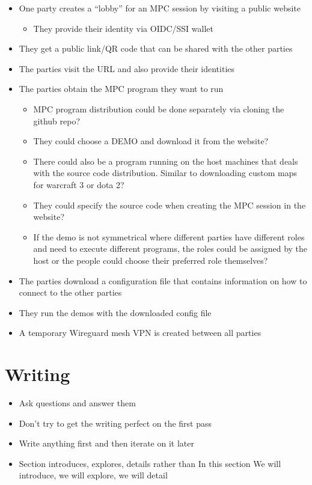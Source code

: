 \begin{itemize}
\tightlist
\item
  One party creates a ``lobby'' for an MPC session by visiting a public website

  \begin{itemize}
  \tightlist
  \item
    They provide their identity via OIDC/SSI wallet
  \end{itemize}
\item
  They get a public link/QR code that can be shared with the other parties
\item
  The parties visit the URL and also provide their identities
\item
  The parties obtain the MPC program they want to run

  \begin{itemize}
  \tightlist
  \item
    MPC program distribution could be done separately via cloning the github repo?
  \item
    They could choose a DEMO and download it from the website?
  \item
    There could also be a program running on the host machines that deals with the source code distribution. Similar to downloading custom maps for warcraft 3 or dota 2?
  \item
    They could specify the source code when creating the MPC session in the website?
  \item
    If the demo is not symmetrical where different parties have different roles and need to execute different programs, the roles could be assigned by the host or the people could choose their preferred role themselves?
  \end{itemize}
\item
  The parties download a configuration file that contains information on how to connect to the other parties
\item
  They run the demos with the downloaded config file
\item
  A temporary Wireguard mesh VPN is created between all parties
\end{itemize}

\label{notes__04000-writing.md}
\chapter{Writing}\label{notes__04000-writing.md__writing}

\begin{itemize}
\item
  Ask questions and answer them
\item
  Don't try to get the writing perfect on the first pass
\item
  Write anything first and then iterate on it later
\item
  Section introduces, explores, details rather than In this section We will introduce, we will explore, we will detail
\end{itemize}

